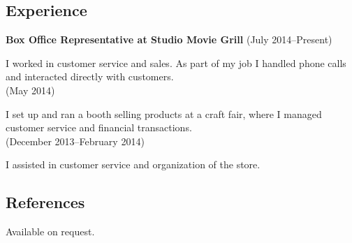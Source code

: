 \documentclass[10pt]{article}
\begin{document}
\subsection*{Experience}
{\bf Box Office Representative at Studio Movie Grill}  (July 2014--Present)

\noindent I worked in customer service and sales.  As part of my job I 
handled phone calls and interacted directly with customers. \\


 (May 2014)

\noindent I set up and ran a booth selling products at a craft fair, where I
managed customer service and financial transactions. \\


 (December 2013--February 2014)

\noindent I assisted in customer service and organization of the store. \\
\subsection*{References}
Available on request.
\end{document}
